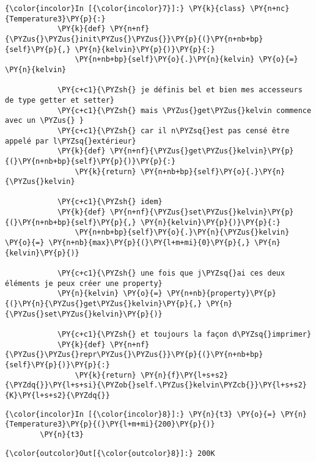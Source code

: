     \begin{Verbatim}[commandchars=\\\{\}]
{\color{incolor}In [{\color{incolor}7}]:} \PY{k}{class} \PY{n+nc}{Temperature3}\PY{p}{:}
            \PY{k}{def} \PY{n+nf}{\PYZus{}\PYZus{}init\PYZus{}\PYZus{}}\PY{p}{(}\PY{n+nb+bp}{self}\PY{p}{,} \PY{n}{kelvin}\PY{p}{)}\PY{p}{:}
                \PY{n+nb+bp}{self}\PY{o}{.}\PY{n}{kelvin} \PY{o}{=} \PY{n}{kelvin}
        
            \PY{c+c1}{\PYZsh{} je définis bel et bien mes accesseurs de type getter et setter}
            \PY{c+c1}{\PYZsh{} mais \PYZus{}get\PYZus{}kelvin commence avec un \PYZus{} }
            \PY{c+c1}{\PYZsh{} car il n\PYZsq{}est pas censé être appelé par l\PYZsq{}extérieur}
            \PY{k}{def} \PY{n+nf}{\PYZus{}get\PYZus{}kelvin}\PY{p}{(}\PY{n+nb+bp}{self}\PY{p}{)}\PY{p}{:}
                \PY{k}{return} \PY{n+nb+bp}{self}\PY{o}{.}\PY{n}{\PYZus{}kelvin}
        
            \PY{c+c1}{\PYZsh{} idem}
            \PY{k}{def} \PY{n+nf}{\PYZus{}set\PYZus{}kelvin}\PY{p}{(}\PY{n+nb+bp}{self}\PY{p}{,} \PY{n}{kelvin}\PY{p}{)}\PY{p}{:}
                \PY{n+nb+bp}{self}\PY{o}{.}\PY{n}{\PYZus{}kelvin} \PY{o}{=} \PY{n+nb}{max}\PY{p}{(}\PY{l+m+mi}{0}\PY{p}{,} \PY{n}{kelvin}\PY{p}{)}
                
            \PY{c+c1}{\PYZsh{} une fois que j\PYZsq{}ai ces deux éléments je peux créer une property}
            \PY{n}{kelvin} \PY{o}{=} \PY{n+nb}{property}\PY{p}{(}\PY{n}{\PYZus{}get\PYZus{}kelvin}\PY{p}{,} \PY{n}{\PYZus{}set\PYZus{}kelvin}\PY{p}{)}
            
            \PY{c+c1}{\PYZsh{} et toujours la façon d\PYZsq{}imprimer}
            \PY{k}{def} \PY{n+nf}{\PYZus{}\PYZus{}repr\PYZus{}\PYZus{}}\PY{p}{(}\PY{n+nb+bp}{self}\PY{p}{)}\PY{p}{:}
                \PY{k}{return} \PY{n}{f}\PY{l+s+s2}{\PYZdq{}}\PY{l+s+si}{\PYZob{}self.\PYZus{}kelvin\PYZcb{}}\PY{l+s+s2}{K}\PY{l+s+s2}{\PYZdq{}}    
\end{Verbatim}


    \begin{Verbatim}[commandchars=\\\{\}]
{\color{incolor}In [{\color{incolor}8}]:} \PY{n}{t3} \PY{o}{=} \PY{n}{Temperature3}\PY{p}{(}\PY{l+m+mi}{200}\PY{p}{)}
        \PY{n}{t3}
\end{Verbatim}


\begin{Verbatim}[commandchars=\\\{\}]
{\color{outcolor}Out[{\color{outcolor}8}]:} 200K
\end{Verbatim}
            
